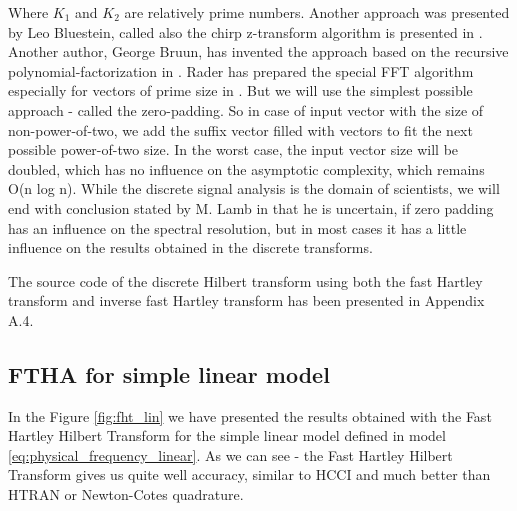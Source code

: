 \documentclass[12pt,twoside,a4paper]{article}
\numberwithin{equation}{subsection}
\numberwithin{figure}{subsection}
\begin{document}
Where $K_1$ and $K_2$ are relatively prime numbers. Another approach was presented by Leo Bluestein, called also the chirp
z-transform algorithm is presented in \cite{bluestein_linear}. Another author, George Bruun, has invented the approach based on
the recursive polynomial-factorization in \cite{bruun_ztransform}. Rader has prepared the special FFT algorithm especially for
vectors of prime size in \cite{rader_dicrete}. But we will use the simplest possible approach - called the zero-padding. So in case
of input vector with the size of non-power-of-two, we add the suffix vector filled with vectors to fit the next possible
power-of-two size. In the worst case, the input vector size will be doubled, which has no influence on the asymptotic complexity,
which remains O(n log n). While the discrete signal analysis is the domain of scientists, we will end with conclusion stated by M.
Lamb in \cite{lamb_issues} that he is uncertain, if zero padding has an influence on the spectral resolution, but in most cases it
has a little influence on the results obtained in the discrete transforms.

The source code of the discrete Hilbert transform using both the fast Hartley transform and inverse fast Hartley transform has been
presented in Appendix A.4.

\subsection{FTHA for simple linear model} \label{chap:hartley_lin}

In the Figure \ref{fig:fht_lin} we have presented the results obtained with the Fast Hartley Hilbert Transform for the simple
linear model defined in model \ref{eq:physical_frequency_linear}. As we can see - the Fast Hartley Hilbert Transform gives us quite well accuracy,
similar to HCCI and much better than HTRAN or Newton-Cotes quadrature. 
\end{document}
